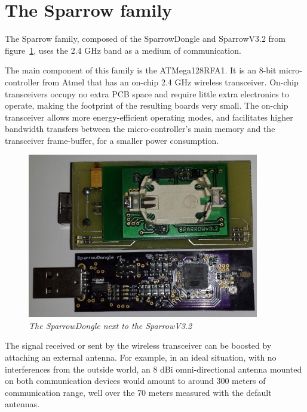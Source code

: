 \section{The Sparrow family}

The Sparrow family, composed of the SparrowDongle and SparrowV3.2 from figure~\ref{fig:sparrowfamily}, uses the 2.4 GHz band as a medium of communication. 
 

The main component of this family is the ATMega128RFA1. It is an 8-bit micro-controller from Atmel that has an on-chip 2.4 GHz wireless transceiver. On-chip transceivers occupy no extra PCB space and require little extra electronics to operate, making the footprint of the resulting boards very small. The on-chip transceiver allows more energy-efficient operating modes, and facilitates higher bandwidth transfers between the micro-controller's main memory and the transceiver frame-buffer, for a smaller power consumption.

\begin{figure}[ht]
\begin{center}
\includegraphics[width=0.9\textwidth]{img/sparrow.jpg}
\end{center}
\caption{\small \itshape{The SparrowDongle next to the SparrowV3.2}}
  \label{fig:sparrowfamily}
\end{figure}

The signal received or sent by the wireless transceiver can be boosted by attaching an external antenna. For example, in an ideal situation, with no interferences from the outside world, an 8 dBi omni-directional antenna mounted on both communication devices would amount to around 300 meters of communication range, well over the 70 meters measured with the default antennas.

